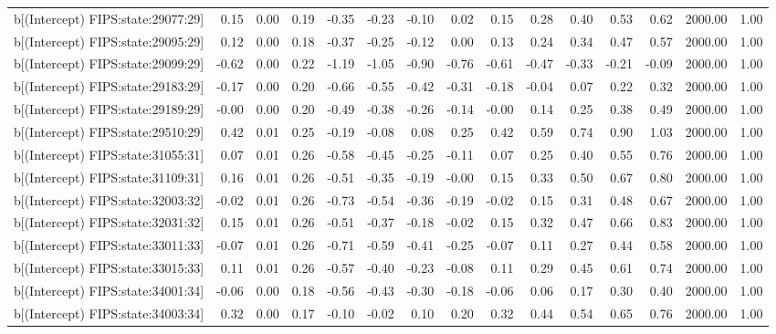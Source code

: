 \begin{table}[ht]
\begin{tabular}{rrrrrrrrrrrrrrr}
  b[(Intercept) FIPS:state:29077:29] & 0.15 & 0.00 & 0.19 & -0.35 & -0.23 & -0.10 & 0.02 & 0.15 & 0.28 & 0.40 & 0.53 & 0.62 & 2000.00 & 1.00 \\ 
  b[(Intercept) FIPS:state:29095:29] & 0.12 & 0.00 & 0.18 & -0.37 & -0.25 & -0.12 & 0.00 & 0.13 & 0.24 & 0.34 & 0.47 & 0.57 & 2000.00 & 1.00 \\ 
  b[(Intercept) FIPS:state:29099:29] & -0.62 & 0.00 & 0.22 & -1.19 & -1.05 & -0.90 & -0.76 & -0.61 & -0.47 & -0.33 & -0.21 & -0.09 & 2000.00 & 1.00 \\ 
  b[(Intercept) FIPS:state:29183:29] & -0.17 & 0.00 & 0.20 & -0.66 & -0.55 & -0.42 & -0.31 & -0.18 & -0.04 & 0.07 & 0.22 & 0.32 & 2000.00 & 1.00 \\ 
  b[(Intercept) FIPS:state:29189:29] & -0.00 & 0.00 & 0.20 & -0.49 & -0.38 & -0.26 & -0.14 & -0.00 & 0.14 & 0.25 & 0.38 & 0.49 & 2000.00 & 1.00 \\ 
  b[(Intercept) FIPS:state:29510:29] & 0.42 & 0.01 & 0.25 & -0.19 & -0.08 & 0.08 & 0.25 & 0.42 & 0.59 & 0.74 & 0.90 & 1.03 & 2000.00 & 1.00 \\ 
  b[(Intercept) FIPS:state:31055:31] & 0.07 & 0.01 & 0.26 & -0.58 & -0.45 & -0.25 & -0.11 & 0.07 & 0.25 & 0.40 & 0.55 & 0.76 & 2000.00 & 1.00 \\ 
  b[(Intercept) FIPS:state:31109:31] & 0.16 & 0.01 & 0.26 & -0.51 & -0.35 & -0.19 & -0.00 & 0.15 & 0.33 & 0.50 & 0.67 & 0.80 & 2000.00 & 1.00 \\ 
  b[(Intercept) FIPS:state:32003:32] & -0.02 & 0.01 & 0.26 & -0.73 & -0.54 & -0.36 & -0.19 & -0.02 & 0.15 & 0.31 & 0.48 & 0.67 & 2000.00 & 1.00 \\ 
  b[(Intercept) FIPS:state:32031:32] & 0.15 & 0.01 & 0.26 & -0.51 & -0.37 & -0.18 & -0.02 & 0.15 & 0.32 & 0.47 & 0.66 & 0.83 & 2000.00 & 1.00 \\ 
  b[(Intercept) FIPS:state:33011:33] & -0.07 & 0.01 & 0.26 & -0.71 & -0.59 & -0.41 & -0.25 & -0.07 & 0.11 & 0.27 & 0.44 & 0.58 & 2000.00 & 1.00 \\ 
  b[(Intercept) FIPS:state:33015:33] & 0.11 & 0.01 & 0.26 & -0.57 & -0.40 & -0.23 & -0.08 & 0.11 & 0.29 & 0.45 & 0.61 & 0.74 & 2000.00 & 1.00 \\ 
  b[(Intercept) FIPS:state:34001:34] & -0.06 & 0.00 & 0.18 & -0.56 & -0.43 & -0.30 & -0.18 & -0.06 & 0.06 & 0.17 & 0.30 & 0.40 & 2000.00 & 1.00 \\ 
  b[(Intercept) FIPS:state:34003:34] & 0.32 & 0.00 & 0.17 & -0.10 & -0.02 & 0.10 & 0.20 & 0.32 & 0.44 & 0.54 & 0.65 & 0.76 & 2000.00 & 1.00 \\ 

\end{tabular}
\end{table}
